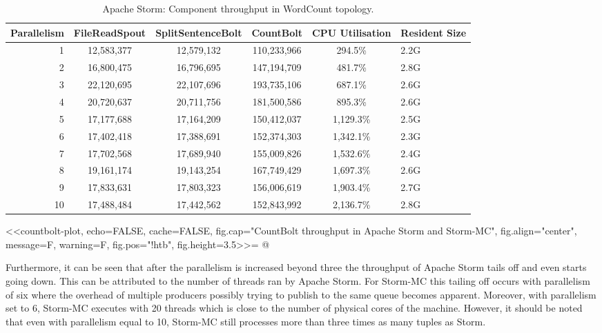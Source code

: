 \begin{table}[!htb]
\begin{adjustwidth}{-0.5in}{-0.5in}
\centering
\small
\begin{tabular}{@{}rccccl@{}}
    \textbf{Parallelism} & \textbf{FileReadSpout} & \textbf{SplitSentenceBolt} & \textbf{CountBolt} & \textbf{CPU Utilisation} & \textbf{Resident Size} \\ \toprule
    1 & {12,583,377} & {12,579,132} & {110,233,966} & {294.5\%} & {2.2G} \\
    2 & {16,800,475} & {16,796,695} & {147,194,709} & {481.7\%} & {2.8G} \\
    3 & {22,120,695} & {22,107,696} & {193,735,106} & {687.1\%} & {2.6G} \\
    4 & {20,720,637} & {20,711,756} & {181,500,586} & {895.3\%} & {2.6G} \\
	5 & {17,177,688} & {17,164,209} & {150,412,037} & {1,129.3\%} & {2.5G} \\
	6 & {17,402,418} & {17,388,691} & {152,374,303} & {1,342.1\%} & {2.3G} \\
	7 & {17,702,568} & {17,689,940} & {155,009,826} & {1,532.6\%} & {2.4G} \\
	8 & {19,161,174} & {19,143,254} & {167,749,429} & {1,697.3\%} & {2.6G} \\
	9 & {17,833,631} & {17,803,323} & {156,006,619} & {1,903.4\%} & {2.7G} \\
	10 & {17,488,484} & {17,442,562} & {152,843,992} & {2,136.7\%} & {2.8G} \\
\end{tabular}
\caption{Apache Storm: Component throughput in WordCount topology.}
\label{table:storm_wordcount}
\end{adjustwidth}
\end{table}

<<countbolt-plot, echo=FALSE, cache=FALSE, fig.cap="CountBolt throughput in Apache Storm and Storm-MC", fig.align="center", message=F, warning=F, fig.pos="!htb", fig.height=3.5>>=
@

Furthermore, it can be seen that after the parallelism is increased beyond three the throughput of Apache Storm tails off and even starts going down. This can be attributed to the number of threads ran by Apache Storm. For Storm-MC this tailing off occurs with parallelism of six where the overhead of multiple producers possibly trying to publish to the same queue becomes apparent. Moreover, with parallelism set to 6, Storm-MC executes with 20 threads which is close to the number of physical cores of the machine. However, it should be noted that even with parallelism equal to 10, Storm-MC still processes more than three times as many tuples as Storm.

